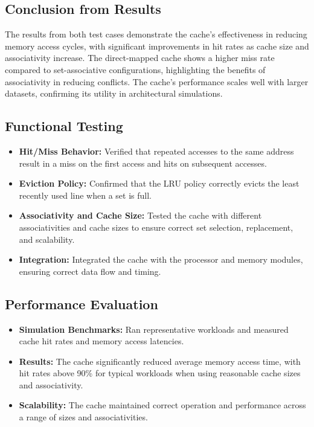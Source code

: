 \documentclass[12pt,a4paper]{report}
\begin{document}
\subsection{Conclusion from Results}
The results from both test cases demonstrate the cache's effectiveness in reducing memory access cycles, with significant improvements in hit rates as cache size and associativity increase. The direct-mapped cache shows a higher miss rate compared to set-associative configurations, highlighting the benefits of associativity in reducing conflicts. The cache's performance scales well with larger datasets, confirming its utility in architectural simulations.

\subsection{Functional Testing}
\begin{itemize}
  \item \textbf{Hit/Miss Behavior:} Verified that repeated accesses to the same address result in a miss on the first access and hits on subsequent accesses.
  \item \textbf{Eviction Policy:} Confirmed that the LRU policy correctly evicts the least recently used line when a set is full.
  \item \textbf{Associativity and Cache Size:} Tested the cache with different associativities and cache sizes to ensure correct set selection, replacement, and scalability.
  \item \textbf{Integration:} Integrated the cache with the processor and memory modules, ensuring correct data flow and timing.
\end{itemize}

\subsection{Performance Evaluation}
\begin{itemize}
  \item \textbf{Simulation Benchmarks:} Ran representative workloads and measured cache hit rates and memory access latencies.
  \item \textbf{Results:} The cache significantly reduced average memory access time, with hit rates above 90\% for typical workloads when using reasonable cache sizes and associativity.
  \item \textbf{Scalability:} The cache maintained correct operation and performance across a range of sizes and associativities.
\end{itemize}
\end{document}
